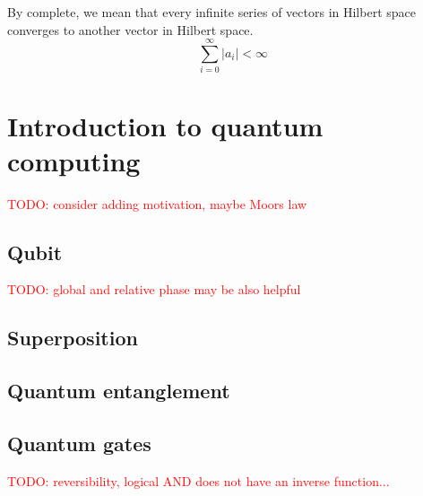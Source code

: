 By complete, we mean that every infinite series of vectors in Hilbert space converges to another vector in Hilbert space. $$\sum_{i=0}^{\infty}\vert a_i \vert < \infty$$

\section{Introduction to quantum computing}
\textcolor{red}{TODO: consider adding motivation, maybe Moors law}

\subsection{Qubit}
\textcolor{red}{TODO: global and relative phase may be also helpful}

\subsection{Superposition}
\subsection{Quantum entanglement}
\subsection{Quantum gates}
\textcolor{red}{TODO: reversibility, logical AND does not have an inverse function...}